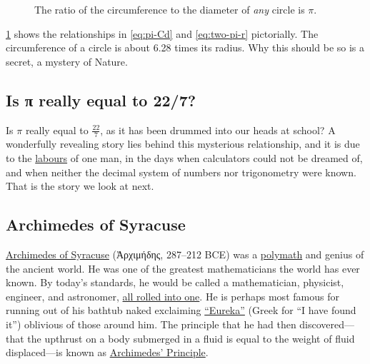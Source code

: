 \documentclass[
  a4paper,
]{article}
\begin{document}
\begin{figure}
\centering

\caption{The ratio of the circumference to the diameter of \emph{any}
circle is \(\pi\).}\label{fig:pi-circle}
\end{figure}

\cref{fig:pi-circle} shows the relationships in \cref{eq:pi-Cd} and
\cref{eq:two-pi-r} pictorially. The circumference of a circle is about
6.28 times its radius. Why this should be so is a secret, a mystery of
Nature.

\subsection{Is π really equal to
22/7?}\label{is-ux3c0-really-equal-to-227}

Is \(\pi\) really equal to \(\frac{22}{7}\), as it has been drummed into
our heads at school? A wonderfully revealing story lies behind this
mysterious relationship, and it is due to the
\href{https://www.collinsdictionary.com/dictionary/english/labours}{labours}
of one man, in the days when calculators could not be dreamed of, and
when neither the decimal system of numbers nor trigonometry were known.
That is the story we look at next.

\subsection{Archimedes of Syracuse}\label{archimedes-of-syracuse}

\href{https://en.wikipedia.org/wiki/Archimedes}{Archimedes of Syracuse}
(Ἀρχιμήδης, 287--212 BCE) was a
\href{https://www.vocabulary.com/dictionary/polymath\#:~:text=Definitions\%20of\%20polymath,of\%20great\%20and\%20varied\%20learning}{polymath}
and genius of the ancient world. He was one of the greatest
mathematicians the world has ever known. By today's standards, he would
be called a mathematician, physicist, engineer, and astronomer,
\href{https://www.ldoceonline.com/dictionary/all-rolled-into-one}{all
rolled into one}. He is perhaps most famous for running out of his
bathtub naked exclaiming
\href{https://www.dictionary.com/browse/eureka}{``Eureka''} (Greek for
``I have found it'') oblivious of those around him. The principle that
he had then discovered---that the upthrust on a body submerged in a
fluid is equal to the weight of fluid displaced---is known as
\href{https://www.britannica.com/science/Archimedes-principle}{Archimedes'
Principle}.
\end{document}
